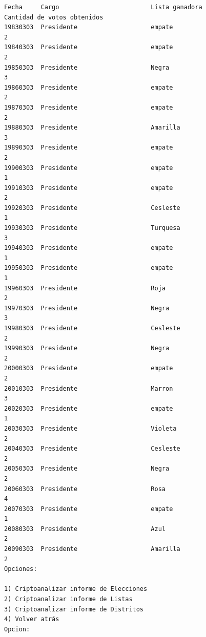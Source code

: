 \documentclass[a4paper,10pt]{article}
\begin{document}
\begin{verbatim}
Fecha     Cargo                         Lista ganadora                          Cantidad de votos obtenidos
19830303  Presidente                    empate                                  2              
19840303  Presidente                    empate                                  2              
19850303  Presidente                    Negra                                   3              
19860303  Presidente                    empate                                  2              
19870303  Presidente                    empate                                  2              
19880303  Presidente                    Amarilla                                3              
19890303  Presidente                    empate                                  2              
19900303  Presidente                    empate                                  1              
19910303  Presidente                    empate                                  2              
19920303  Presidente                    Cesleste                                1              
19930303  Presidente                    Turquesa                                3              
19940303  Presidente                    empate                                  1              
19950303  Presidente                    empate                                  1              
19960303  Presidente                    Roja                                    2              
19970303  Presidente                    Negra                                   3              
19980303  Presidente                    Cesleste                                2              
19990303  Presidente                    Negra                                   2              
20000303  Presidente                    empate                                  2              
20010303  Presidente                    Marron                                  3              
20020303  Presidente                    empate                                  1              
20030303  Presidente                    Violeta                                 2              
20040303  Presidente                    Cesleste                                2              
20050303  Presidente                    Negra                                   2              
20060303  Presidente                    Rosa                                    4              
20070303  Presidente                    empate                                  1              
20080303  Presidente                    Azul                                    2              
20090303  Presidente                    Amarilla                                2              
Opciones: 

1) Criptoanalizar informe de Elecciones
2) Criptoanalizar informe de Listas
3) Criptoanalizar informe de Distritos
4) Volver atrás
Opcion: 
\end{verbatim}
\end{document}
